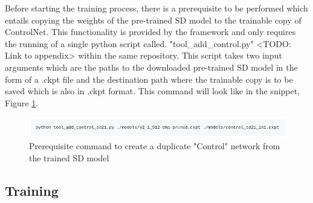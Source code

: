 Before starting the training process, there is a prerequisite to be performed which entails copying the weights of the pre-trained SD model to the trainable copy of ControlNet. This functionality is provided by the framework and only requires the running of  a single python script called. "tool_add_control.py" <TODO: Link to appendix> within the same repository. This script takes two input arguments which are the paths to the downloaded pre-trained SD model in the form of a .ckpt file and the destination path where the trainable copy is to be saved which is also in .ckpt format. This command will look like in the snippet, Figure \ref{fig:copy-sd-control}.
\begin{figure}[h]
    \centering
    \includegraphics[width=1\linewidth]{4_ResearchMethodology/figures/ckpt_copy.png}
    \caption[Prerequisite command to copy weights]{Prerequisite command to create a duplicate "Control" network from the trained SD model \parencite[GitHub: ControlNet/docs/train.md]{Zhang2023AddingModels}}
    \label{fig:copy-sd-control}
\end{figure}

\subsection{Training}

